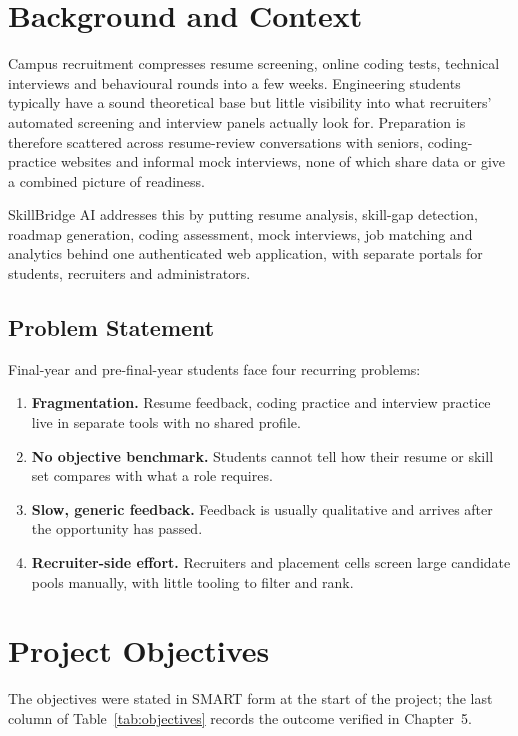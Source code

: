 \documentclass[openany]{tietreport}
\begin{document}
\section{Background and Context}
Campus recruitment compresses resume screening, online coding tests, technical interviews and behavioural rounds into a few weeks. Engineering students typically have a sound theoretical base but little visibility into what recruiters' automated screening and interview panels actually look for. Preparation is therefore scattered across resume-review conversations with seniors, coding-practice websites and informal mock interviews, none of which share data or give a combined picture of readiness.

SkillBridge AI addresses this by putting resume analysis, skill-gap detection, roadmap generation, coding assessment, mock interviews, job matching and analytics behind one authenticated web application, with separate portals for students, recruiters and administrators.

\subsection{Problem Statement}
Final-year and pre-final-year students face four recurring problems:
\begin{enumerate}
  \item \textbf{Fragmentation.} Resume feedback, coding practice and interview practice live in separate tools with no shared profile.
  \item \textbf{No objective benchmark.} Students cannot tell how their resume or skill set compares with what a role requires.
  \item \textbf{Slow, generic feedback.} Feedback is usually qualitative and arrives after the opportunity has passed.
  \item \textbf{Recruiter-side effort.} Recruiters and placement cells screen large candidate pools manually, with little tooling to filter and rank.
\end{enumerate}

\section{Project Objectives}
The objectives were stated in SMART form at the start of the project; the last column of Table~\ref{tab:objectives} records the outcome verified in Chapter~5.
\end{document}

